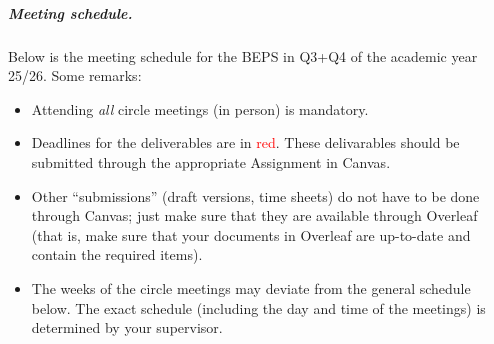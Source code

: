 \documentclass[report,english,cleveref,autoref,a4paper]{lipics-v2021}
\begin{document}
\subparagraph{Meeting schedule.}
Below is the meeting schedule for the BEPS in Q3+Q4 of the academic year 25/26.
Some remarks:
\begin{itemize}
\item Attending \emph{all} circle meetings (in person) is mandatory.
\item Deadlines for the deliverables are in \textcolor{red}{red}. These delivarables
should be submitted through the appropriate Assignment in Canvas.
\item Other ``submissions'' (draft versions, time sheets) do not have to be done through
       Canvas; just make sure that they are available through Overleaf (that is,
       make sure that your documents in Overleaf are up-to-date and contain
       the required items).
\item The weeks of the circle meetings may deviate from the general schedule below.
The exact schedule (including the day and time of the meetings) is determined by your supervisor.
\end{itemize}
\end{document}
